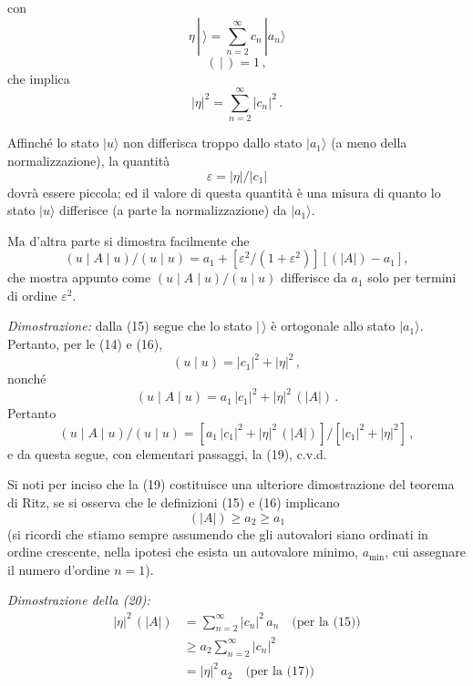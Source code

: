 \documentclass[11pt, a4paper]{book}
\numberwithin{equation}{section}
\begin{document}
con
\begin{equation}
\eta\, |\,\rangle = \sum_{n=2}^{\infty} c_n\, |a_n\rangle \tag{15}
\end{equation}
\begin{equation}
(\,|\,) = 1 \,, \tag{16}
\end{equation}
che implica
\begin{equation}
|\eta|^2 = \sum_{n=2}^{\infty} |c_n|^2 \,. \tag{17}
\end{equation}

Affinché lo stato $|u\rangle$ non differisca troppo dallo stato $|a_1\rangle$ (a meno
della normalizzazione), la quantità
\begin{equation}
\varepsilon = |\eta| / |c_1| \tag{18}
\end{equation}
dovrà essere piccola; ed il valore di questa quantità è una misura di
quanto lo stato $|u\rangle$ differisce (a parte la normalizzazione) da $|a_1\rangle$.

Ma d'altra parte si dimostra facilmente che
\begin{equation}
(u \mid A \mid u) / (u \mid u) = a_1 + \left[\varepsilon^2/(1+\varepsilon^2)\right]\left[(|A|) - a_1\right], \tag{19}
\end{equation}
che mostra appunto come $(u \mid A \mid u)/(u \mid u)$ differisce da $a_1$ solo per
termini di ordine $\varepsilon^2$.

\textit{Dimostrazione:} dalla (15) segue che lo stato $|\,\rangle$ è ortogonale
allo stato $|a_1\rangle$. Pertanto, per le (14) e (16),
\[
(u \mid u) = |c_1|^2 + |\eta|^2 \,,
\]
nonché
\[
(u \mid A \mid u) = a_1\, |c_1|^2 + |\eta|^2\, (|A|) \,.
\]
Pertanto
\[
(u \mid A \mid u)/(u \mid u) = \left[a_1\, |c_1|^2 + |\eta|^2\, (|A|)\right] / \left[|c_1|^2 + |\eta|^2\right] \,,
\]
e da questa segue, con elementari passaggi, la (19), c.v.d.


Si noti per inciso che la (19) costituisce una ulteriore dimostrazione del teorema di Ritz, se si osserva che le definizioni (15)
e (16) implicano
\begin{equation}
(|A|) \geq a_2 \geq a_1 \tag{20}
\end{equation}
(si ricordi che stiamo sempre assumendo che gli autovalori siano
ordinati in ordine crescente, nella ipotesi che esista un autovalore
minimo, $a_{\min}$, cui assegnare il numero d'ordine $n = 1$).

\textit{Dimostrazione della (20):}
\begin{align*}
|\eta|^2\, (|A|) &= \sum_{n=2}^{\infty} |c_n|^2\, a_n \quad \text{(per la (15))} \\
&\geq a_2 \sum_{n=2}^{\infty} |c_n|^2 \\
&= |\eta|^2\, a_2 \quad \text{(per la (17))}
\end{align*}
\end{document}
